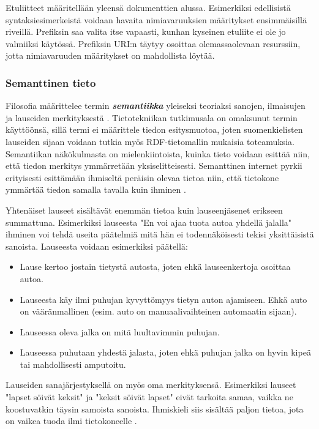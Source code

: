 \documentclass[finnish, 12pt, a4paper, elec, utf8, pdfa, online]{aaltothesis}
\begin{document}
Etuliitteet määritellään yleensä dokumenttien alussa. Esimerkiksi edellisistä syntaksiesimerkeistä voidaan havaita nimiavaruuksien määritykset ensimmäisillä riveillä. Prefiksin saa valita itse vapaasti, kunhan kyseinen etuliite ei ole jo valmiiksi käytössä. Prefiksin URI:n täytyy osoittaa olemassaolevaan resurssiin, jotta nimiavaruuden määritykset on mahdollista löytää.



\subsubsection{Semanttinen tieto}

Filosofia määrittelee termin \textbf{\textit{semantiikka}} yleiseksi teoriaksi sanojen, ilmaisujen ja lauseiden merkityksestä \cite{semantics_phi}. Tietotekniikan tutkimusala on omaksunut termin käyttöönsä, sillä termi ei määrittele tiedon esitysmuotoa, joten suomenkielisten lauseiden sijaan voidaan tutkia myös RDF-tietomallin mukaisia toteamuksia. Semantiikan näkökulmasta on mielenkiintoista, kuinka tieto voidaan esittää niin, että tiedon merkitys ymmärretään yksiselitteisesti. Semanttinen internet pyrkii erityisesti esittämään ihmiseltä peräisin olevaa tietoa niin, että tietokone ymmärtää tiedon samalla tavalla kuin ihminen \cite{Berners_visio}.

Yhtenäiset lauseet sisältävät enemmän tietoa kuin lauseenjäsenet erikseen summattuna. Esimerkiksi lauseesta "En voi ajaa tuota autoa yhdellä jalalla" ihminen voi tehdä useita päätelmiä mitä hän ei todennäköisesti tekisi yksittäisistä sanoista. Lauseesta voidaan esimerkiksi päätellä:
\begin{itemize}
  \item  Lause kertoo jostain tietystä autosta, joten ehkä lauseenkertoja osoittaa autoa.
  \item  Lauseesta käy ilmi puhujan kyvyttömyys tietyn auton ajamiseen. Ehkä auto on vääränmallinen (esim. auto on manuaalivaihteinen automaatin sijaan).
  \item  Lauseessa oleva jalka on mitä luultavimmin puhujan.
  \item  Lauseessa puhutaan yhdestä jalasta, joten ehkä puhujan jalka on hyvin kipeä tai mahdollisesti amputoitu.
\end{itemize}
Lauseiden sanajärjestyksellä on myös oma merkityksensä. Esimerkiksi lauseet "lapset söivät keksit" ja "keksit söivät lapset" eivät tarkoita samaa, vaikka ne koostuvatkin täysin samoista sanoista. Ihmiskieli siis sisältää paljon tietoa, jota on vaikea tuoda ilmi tietokoneelle \cite{semantics}.
\end{document}
